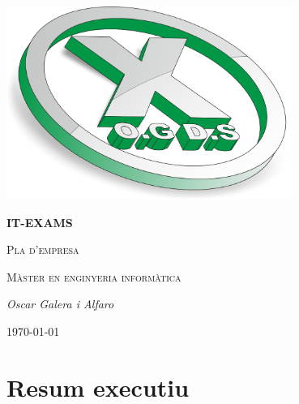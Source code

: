 \documentclass[12pt]{article}
\begin{document}
\begin{titlepage}
		\centering
		\includegraphics[width=0.7\textwidth]{imatges/icona_gran.png}\par\vspace{1cm}
		{\huge\bfseries IT-EXAMS\par}
		\vspace{1cm}
		{\scshape\Large Pla d'empresa\par}
		\vspace{1cm}
		{\scshape\Large Màster en enginyeria informàtica\par}
		\vspace{1.5cm}
		{\Large\itshape Oscar Galera i Alfaro\par}
		\vfill
		{\large \today\par}
\end{titlepage}
\tableofcontents

\clearpage
\section{Resum executiu}
\clearpage
\end{document}

